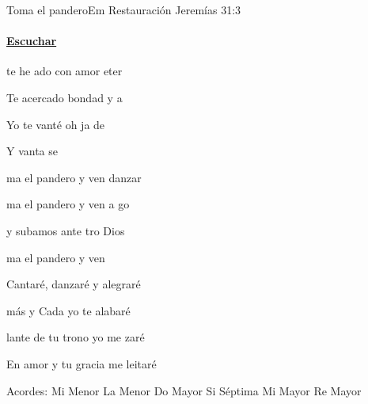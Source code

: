 \documentclass[12pt, spanish]{book}
\begin{document}
    \begin{song}{Toma el  pandero}{Em}
    {} %
    {Restauración}
    {Jeremías 31:3} %
    {}
        \ifChordBk
            \paragraph{\mbox{}\hfill\protect\href{https://open.spotify.com/intl-es/track/7I44iQLWTTp1Lcw1O9tIiY}{Escuchar}\mbox{}\hfill}
        \fi


        \begin{SBOpGroup}
             te he ado con amor eter

            Te  acercado  bondad y a

            Yo te vanté oh ja de 

            Y vanta se
        \end{SBOpGroup}

        \begin{SBChorus}
            ma el pandero y ven  danzar

            ma el pandero y ven a go

             y subamos ante tro Dios

            ma el pandero y ven  
        \end{SBChorus}

        \begin{SBOpGroup}
            Cantaré, danzaré y  alegraré

            más y  Cada  yo te alabaré
        \end{SBOpGroup}

        \begin{SBOpGroup}
            lante de tu trono yo me zaré

            En  amor y tu gracia me leitaré
        \end{SBOpGroup}

        \ifChordBk
        \begin{SBOpGroup}
            Acordes:\break
            \upchord{\Em}\qquad Mi Menor \hfill
            \upchord{\Am}\qquad La Menor \hfill\null\break
            \upchord{\C}\qquad Do Mayor \hfill
            \upchord{\Bseven}\qquad Si S\'eptima \hfill\null\break
            \upchord{\E}\qquad Mi Mayor \hfill
            \upchord{\D}\qquad Re Mayor \hfill\null\break
        \end{SBOpGroup}
        \fi
    \end{song}
\end{document}
